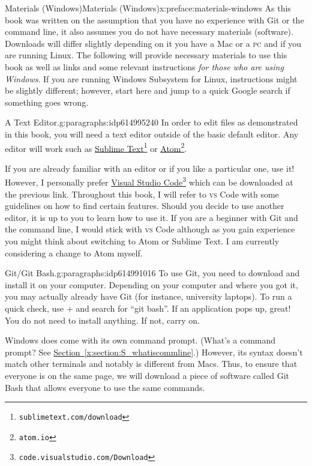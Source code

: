 \documentclass[oneside,10pt,]{book}
\newcommand{\xreffont}{\relax}
\newcommand{\initialism}[1]{\textsc{\MakeLowercase{#1}}}
\newcommand{\kbd}[1]{\keys{{#1}}}
\begin{document}
\begin{preface}{Materials (Windows)}{}{Materials (Windows)}{}{}{x:preface:materials-windows}
As this book was written on the assumption that you have no experience with Git or the command line, it also assumes you do not have necessary materials (software). Downloads will differ slightly depending on it you have a Mac or a \initialism{PC} and if you are running Linux. The following will provide necessary materials to use this book as well as links and some relevant instructions \emph{for those who are using Windows}. If you are running Windows Subsystem for Linux, instructions might be slightly different; however, start here and jump to a quick Google search if something goes wrong.%
\begin{paragraphs}{A Text Editor.}{g:paragraphs:idp614995240}%
In order to edit files as demonstrated in this book, you will need a text editor outside of the basic default editor. Any editor will work such as \href{https://www.sublimetext.com/download}{Sublime Text}\footnote{\nolinkurl{sublimetext.com/download}\label{g:fn:idp614993960}} or \href{https://atom.io}{Atom}\footnote{\nolinkurl{atom.io}\label{g:fn:idp614994088}}.%
\par
If you are already familiar with an editor or if you like a particular one, use it! However, I personally prefer \href{}{Visual Studio Code}\footnote{\nolinkurl{code.visualstudio.com/Download}\label{g:fn:idp614987816}} which can be downloaded at the previous link. Throughout this book, I will refer to \initialism{VS} Code with some guidelines on how to find certain features. Should you decide to use another editor, it is up to you to learn how to use it. If you are a beginner with Git and the command line, I would stick with \initialism{VS} Code although as you gain experience you might think about switching to Atom or Sublime Text. I am currently considering a change to Atom myself.%
\end{paragraphs}%
\begin{paragraphs}{Git\slash{}Git Bash.}{g:paragraphs:idp614991016}%
To use Git, you need to download and install it on your computer. Depending on your computer and where you got it, you may actually already have Git (for instance, university laptops). To run a quick check, use \kbd{Windows} + \kbd{S} and search for ``git bash''. If an application pops up, great! You do not need to install anything. If not, carry on.%
\par
Windows does come with its own command prompt. (What's a command prompt? See \hyperref[x:section:S_whatiscommline]{Section~{\xreffont\ref{x:section:S_whatiscommline}}}.) However, its syntax doesn't match other terminals and notably is different from Macs. Thus, to ensure that everyone is on the same page, we will download a piece of software called Git Bash that allows everyone to use the same commands.%

\end{paragraphs}
\end{preface}
\end{document}
